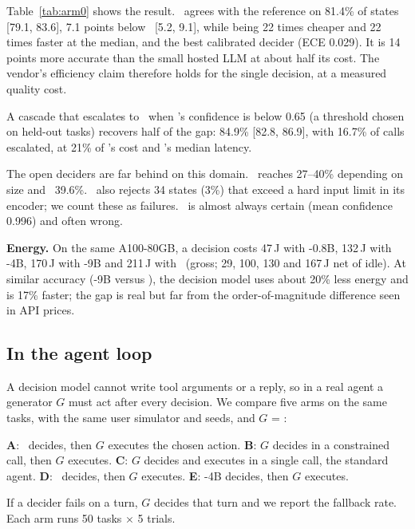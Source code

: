 Table~\ref{tab:arm0} shows the result.
\jev\ agrees with the reference on 81.4\% of states [79.1, 83.6], 7.1 points below \gbig\ [5.2, 9.1], while being 22 times cheaper and 22 times faster at the median, and the best calibrated decider (ECE 0.029).
It is 14 points more accurate than the small hosted LLM at about half its cost.
The vendor's efficiency claim therefore holds for the single decision, at a measured quality cost.

A cascade that escalates to \gbig\ when \jev's confidence is below 0.65 (a threshold chosen on held-out tasks) recovers half of the gap: 84.9\% [82.8, 86.9], with 16.7\% of calls escalated, at 21\% of \gbig's cost and \jev's median latency.

The open deciders are far behind on this domain.
\kev\ reaches 27--40\% depending on size and \qwen\ 39.6\%.
\kev\ also rejects 34 states (3\%) that exceed a hard input limit in its encoder; we count these as failures.
\qwen\ is almost always certain (mean confidence 0.996) and often wrong.

\textbf{Energy.} On the same A100-80GB, a decision costs 47\,J with \kev-0.8B, 132\,J with \kev-4B, 170\,J with \kev-9B and 211\,J with \qwen\ (gross; 29, 100, 130 and 167\,J net of idle).
At similar accuracy (\kev-9B versus \qwen), the decision model uses about 20\% less energy and is 17\% faster; the gap is real but far from the order-of-magnitude difference seen in API prices.

\subsection{In the agent loop}

A decision model cannot write tool arguments or a reply, so in a real agent a generator $G$ must act after every decision.
We compare five arms on the same tasks, with the same user simulator and seeds, and $G$ = \gbig:

\textbf{A}: \jev\ decides, then $G$ executes the chosen action.
\textbf{B}: $G$ decides in a constrained call, then $G$ executes.
\textbf{C}: $G$ decides and executes in a single call, the standard agent.
\textbf{D}: \goss\ decides, then $G$ executes.
\textbf{E}: \kev-4B decides, then $G$ executes.

If a decider fails on a turn, $G$ decides that turn and we report the fallback rate.
Each arm runs 50 tasks $\times$ 5 trials.

